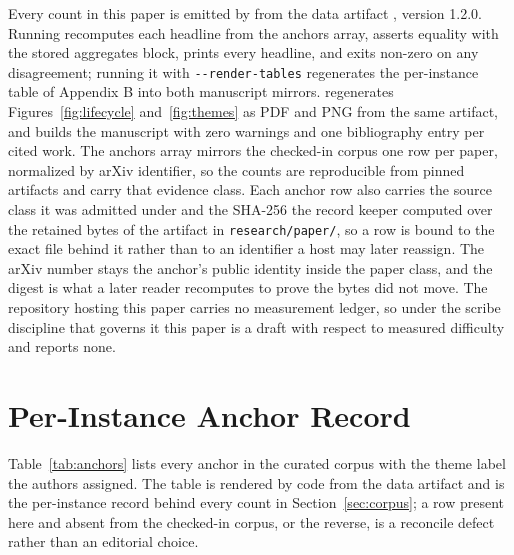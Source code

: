 \documentclass[11pt]{article}
\begin{document}
Every count in this paper is emitted by  from the data artifact , version 1.2.0. Running  recomputes each headline from the anchors array, asserts equality with the stored aggregates block, prints every headline, and exits non-zero on any disagreement; running it with \texttt{-{}-render-tables} regenerates the per-instance table of Appendix B into both manuscript mirrors.  regenerates Figures~\ref{fig:lifecycle} and~\ref{fig:themes} as PDF and PNG from the same artifact, and  builds the manuscript with zero warnings and one bibliography entry per cited work. The anchors array mirrors the checked-in  corpus one row per paper, normalized by arXiv identifier, so the counts are reproducible from pinned artifacts and carry that evidence class. Each anchor row also carries the source class it was admitted under and the SHA-256 the record keeper computed over the retained bytes of the artifact in \texttt{research/paper/}, so a row is bound to the exact file behind it rather than to an identifier a host may later reassign. The arXiv number stays the anchor's public identity inside the paper class, and the digest is what a later reader recomputes to prove the bytes did not move. The repository hosting this paper carries no measurement ledger, so under the scribe discipline that governs it this paper is a draft with respect to measured difficulty and reports none.

\section{Per-Instance Anchor Record}

Table~\ref{tab:anchors} lists every anchor in the curated corpus with the theme label the authors assigned. The table is rendered by code from the data artifact and is the per-instance record behind every count in Section~\ref{sec:corpus}; a row present here and absent from the checked-in corpus, or the reverse, is a reconcile defect rather than an editorial choice.

\begin{table}[ht]
\centering
\small

\caption{The curated anchor corpus, one row per paper (n = 21) with its source class, rendered by code from the data artifact.}
\label{tab:anchors}
\end{table}
\end{document}
